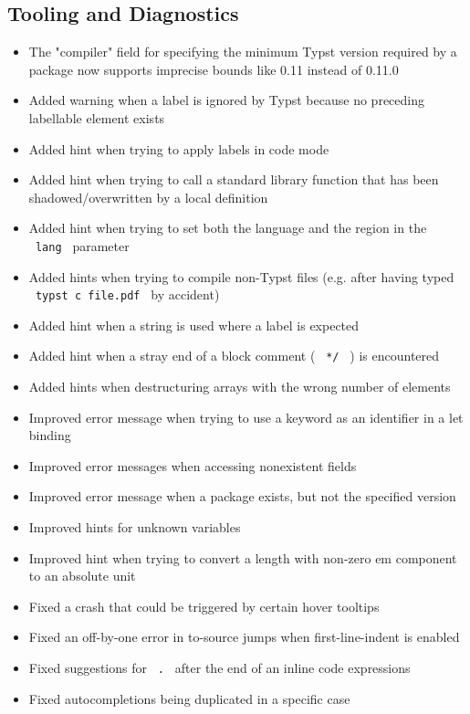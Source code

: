 \subsection{Tooling and Diagnostics}\label{tooling-and-diagnostics}

\begin{itemize}
\tightlist
\item
  The "compiler" field for specifying the minimum Typst version required
  by a package now supports imprecise bounds like 0.11 instead of 0.11.0
\item
  Added warning when a label is ignored by Typst because no preceding
  labellable element exists
\item
  Added hint when trying to apply labels in code mode
\item
  Added hint when trying to call a standard library function that has
  been shadowed/overwritten by a local definition
\item
  Added hint when trying to set both the language and the region in the
  \texttt{\ lang\ } parameter
\item
  Added hints when trying to compile non-Typst files (e.g. after having
  typed \texttt{\ typst\ c\ file.pdf\ } by accident)
\item
  Added hint when a string is used where a label is expected
\item
  Added hint when a stray end of a block comment ( \texttt{\ */\ } ) is
  encountered
\item
  Added hints when destructuring arrays with the wrong number of
  elements
\item
  Improved error message when trying to use a keyword as an identifier
  in a let binding
\item
  Improved error messages when accessing nonexistent fields
\item
  Improved error message when a package exists, but not the specified
  version
\item
  Improved hints for unknown variables
\item
  Improved hint when trying to convert a length with non-zero em
  component to an absolute unit
\item
  Fixed a crash that could be triggered by certain hover tooltips
\item
  Fixed an off-by-one error in to-source jumps when first-line-indent is
  enabled
\item
  Fixed suggestions for \texttt{\ .\ } after the end of an inline code
  expressions
\item
  Fixed autocompletions being duplicated in a specific case
\end{itemize}


